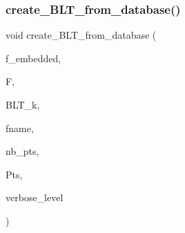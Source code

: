 \subsubsection{\texorpdfstring{create\+\_\+\+B\+L\+T\+\_\+from\+\_\+database()}{create\_BLT\_from\_database()}}
{\footnotesize\ttfamily void create\+\_\+\+B\+L\+T\+\_\+from\+\_\+database (\begin{DoxyParamCaption}\item[{\mbox{\hyperlink{galois_8h_a09fddde158a3a20bd2dcadb609de11dc}{I\+NT}}}]{f\+\_\+embedded,  }\item[{\mbox{\hyperlink{classfinite__field}{finite\+\_\+field}} $\ast$}]{F,  }\item[{\mbox{\hyperlink{galois_8h_a09fddde158a3a20bd2dcadb609de11dc}{I\+NT}}}]{B\+L\+T\+\_\+k,  }\item[{\mbox{\hyperlink{galois_8h_ab6cc7b4aeb6ea31aba2b3fbfc83ff5e6}{B\+Y\+TE}} $\ast$}]{fname,  }\item[{\mbox{\hyperlink{galois_8h_a09fddde158a3a20bd2dcadb609de11dc}{I\+NT}} \&}]{nb\+\_\+pts,  }\item[{\mbox{\hyperlink{galois_8h_a09fddde158a3a20bd2dcadb609de11dc}{I\+NT}} $\ast$\&}]{Pts,  }\item[{\mbox{\hyperlink{galois_8h_a09fddde158a3a20bd2dcadb609de11dc}{I\+NT}}}]{verbose\+\_\+level }\end{DoxyParamCaption})}

\mbox{\label{geometric__object_8_c_a7d62d5ebe3c87e548f9e7bbd3eeebfac}} 
